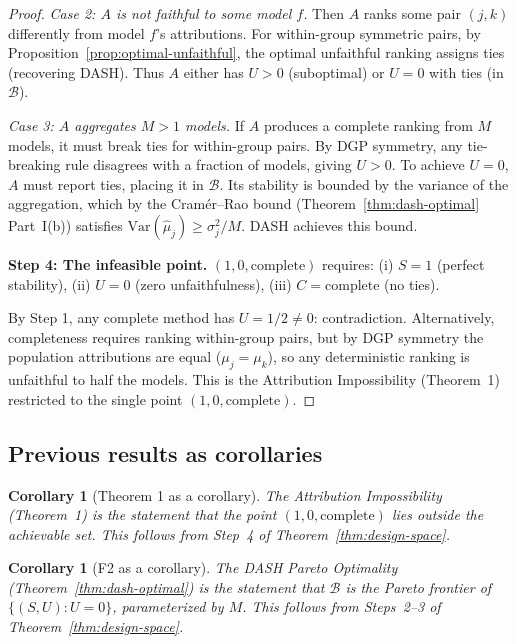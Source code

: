 \documentclass{article}
\newcommand{\Var}{\mathrm{Var}}
\newtheorem{corollary}[theorem]{Corollary}
\begin{document}
\begin{proof}
\emph{Case 2: $A$ is not faithful to some model $f$.}
Then $A$ ranks some pair $(j,k)$ differently from model $f$'s
attributions. For within-group symmetric pairs, by
Proposition~\ref{prop:optimal-unfaithful}, the optimal
unfaithful ranking assigns ties (recovering DASH). Thus $A$
either has $U > 0$ (suboptimal) or $U = 0$ with ties
(in $\mathcal{B}$).

\emph{Case 3: $A$ aggregates $M > 1$ models.}
If $A$ produces a complete ranking from $M$ models, it must
break ties for within-group pairs. By DGP symmetry, any
tie-breaking rule disagrees with a fraction of models, giving
$U > 0$. To achieve $U = 0$, $A$ must report ties, placing
it in $\mathcal{B}$. Its stability is bounded by the variance
of the aggregation, which by the Cram\'er--Rao bound
(Theorem~\ref{thm:dash-optimal} Part~I(b)) satisfies
$\Var(\hat\mu_j) \geq \sigma_j^2/M$. DASH achieves this bound.

\textbf{Step 4: The infeasible point.}
$(1, 0, \text{complete})$ requires: (i) $S = 1$ (perfect stability),
(ii) $U = 0$ (zero unfaithfulness), (iii) $C = \text{complete}$
(no ties).

By Step 1, any complete method has $U = 1/2 \neq 0$: contradiction.
Alternatively, completeness requires ranking within-group pairs,
but by DGP symmetry the population attributions are equal
($\mu_j = \mu_k$), so any deterministic ranking is unfaithful to
half the models. This is the Attribution Impossibility (Theorem~1)
restricted to the single point $(1, 0, \text{complete})$.
\end{proof}

\subsection{Previous results as corollaries}

\begin{corollary}[Theorem 1 as a corollary]
The Attribution Impossibility (Theorem~1) is the statement that the
point $(1, 0, \text{complete})$ lies outside the achievable set.
This follows from Step~4 of Theorem~\ref{thm:design-space}.
\end{corollary}

\begin{corollary}[F2 as a corollary]
The DASH Pareto Optimality (Theorem~\ref{thm:dash-optimal}) is the
statement that $\mathcal{B}$ is the Pareto frontier of
$\{(S, U) : U = 0\}$, parameterized by $M$. This follows from
Steps~2--3 of Theorem~\ref{thm:design-space}.
\end{corollary}
\end{document}
